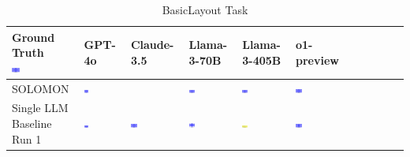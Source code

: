 \begin{table}
  \caption{BasicLayout Task}
  \label{table:basiclayout}
  \centering
  \begin{tabular}{@{}mmmmmm@{}}
    \toprule
    \makecell{Ground Truth \\ \includegraphics[width=0.13\textwidth]{examples_png/BasicLayout.png}} & GPT-4o & Claude-3.5 & Llama-3-70B & Llama-3-405B & o1-preview \\
    \midrule
    SOLOMON & \includegraphics[width=0.13\textwidth]{./pool_all/png/gpt-4o_results/BasicLayout.png} &  & \includegraphics[width=0.13\textwidth]{./pool_all/png/claude-3-5-sonnet-20240620_results/BasicLayout.png} & \includegraphics[width=0.13\textwidth]{./pool_all/png/watsonx_meta-llama_llama-3-1-70b-instruct_results/BasicLayout.png} & \includegraphics[width=0.13\textwidth]{./pool_all/png/watsonx_meta-llama_llama-3-405b-instruct_results/BasicLayout.png} \\
    \makecell{Single LLM \\ Baseline \\ Run 1} & \includegraphics[width=0.13\textwidth]{./run_1/png/gpt-4o_results/BasicLayout.png} & \includegraphics[width=0.13\textwidth]{./run_1/png/o1-preview_results/BasicLayout.png} & \includegraphics[width=0.13\textwidth]{./run_1/png/claude-3-5-sonnet-20240620_results/BasicLayout.png} & \includegraphics[width=0.13\textwidth]{./run_1/png/watsonx_meta-llama_llama-3-1-70b-instruct_results/BasicLayout.png} & \includegraphics[width=0.13\textwidth]{./run_1/png/watsonx_meta-llama_llama-3-405b-instruct_results/BasicLayout.png} \\

\end{tabular}
\end{table}
